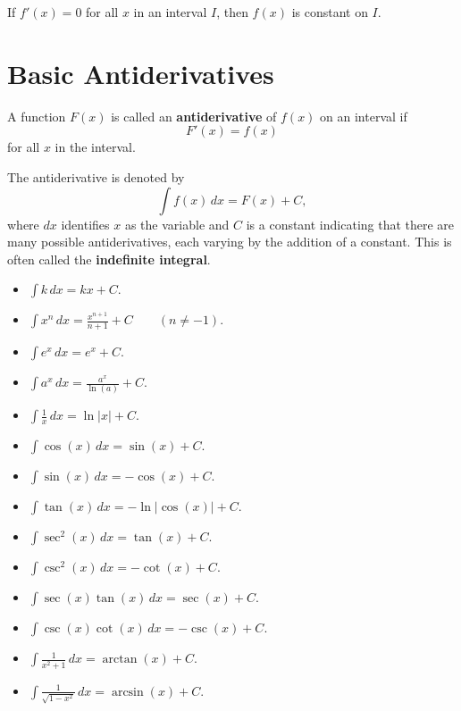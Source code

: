 \documentclass{ximera}
\renewcommand{\d}{\,d}
\begin{document}
\begin{theorem}
If $f'(x)=0$ for all $x$ in an interval $I$, then $f(x)$ is constant
on $I$.
\end{theorem}






\section*{Basic Antiderivatives}







\begin{definition}
A function $F(x)$ is called an \textbf{antiderivative} of $f(x)$ on an
interval if
\[
F'(x) = f(x)
\]
for all $x$ in the interval.
\end{definition}




\begin{definition}
The antiderivative is denoted by
\[
\int f(x) \d x = F(x)+C,
\]
where $dx$ identifies $x$ as the variable and $C$ is a constant
indicating that there are many possible antiderivatives, each varying by
the addition of a constant. This is often called the
\textbf{indefinite integral}.
\end{definition}



\begin{theorem}\label{theorem:basicAnti} \hfil
\begin{multicols}{3}
\begin{itemize}
\item $\int k \d x= kx+C$.
\item $\int x^n \d x= \frac{x^{n+1}}{n+1}+C\qquad(n\ne-1)$.
\item $\int e^x \d x= e^x + C$.
\item $\int a^x \d x= \frac{a^x}{\ln(a)}+C$.
\item $\int \frac{1}{x} \d x= \ln|x|+C$.
\item $\int \cos(x) \d x = \sin(x) + C$.
\item $\int \sin(x) \d x = -\cos(x) + C$.
\item $\int \tan(x) \d x = -\ln|\cos(x)| + C$.
\item $\int \sec^2(x) \d x = \tan(x) + C$.
\item $\int \csc^2(x) \d x = -\cot(x) + C$.
\item $\int \sec(x)\tan(x) \d x = \sec(x) + C$.
\item $\int \csc(x)\cot(x) \d x = -\csc(x) + C$.
\item $\int \frac{1}{x^2+1}\d x = \arctan(x) + C$.
\item $\int \frac{1}{\sqrt{1-x^2}}\d x= \arcsin(x)+C$.
\end{itemize}
\end{multicols}
\end{theorem}
\end{document}
